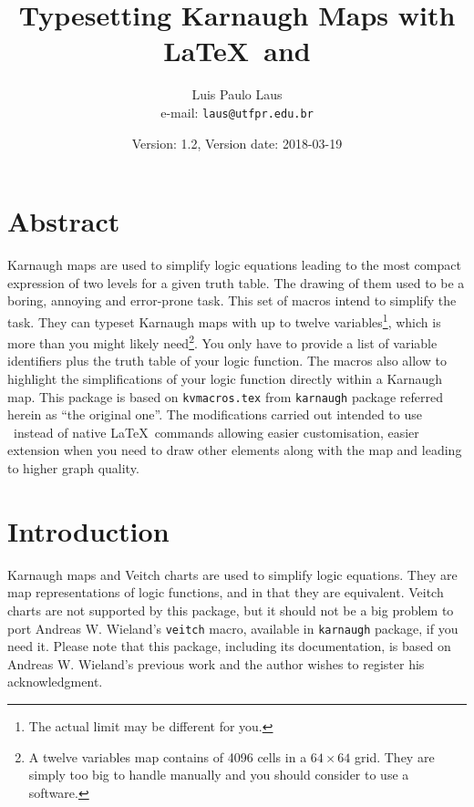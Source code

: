 \documentclass[a4paper]{ltxdoc}
\begin{document}
\title{Typesetting Karnaugh Maps with \LaTeX\ and \tikzname}
\author{Luis Paulo Laus\\e-mail: \texttt{laus@utfpr.edu.br}}
\date{Version: 1.2, Version date: 2018-03-19}

\maketitle


\section{Abstract}

Karnaugh maps are used to simplify logic equations leading to the most compact expression of two levels for a given truth table. The drawing of them used to be a boring, annoying and error-prone task. This set of macros intend to simplify the task. They can typeset Karnaugh maps with up to twelve variables\footnote{The actual limit may be different for you.}, which is more than you might likely need\footnote{A twelve variables map contains of 4096 cells in a $64\times64$ grid. They are simply too big to handle manually and you should consider to use a software.}. You only have to provide a list of variable identifiers plus the truth table of your logic function. The macros also allow to highlight the simplifications of your logic function directly within a Karnaugh map. This package is based on \verb|kvmacros.tex| from \verb|karnaugh| package referred herein as ``the original one''. The modifications carried out intended to use \tikzname\ instead of native \LaTeX\ commands allowing easier customisation, easier extension when you need to draw other elements along with the map and leading to higher graph quality.


\section{Introduction}

Karnaugh maps and Veitch charts are used to simplify logic equations. They are map representations of logic functions, and in that they are equivalent. Veitch charts are not supported by this package, but it should not be a big problem to port Andreas W. Wieland's \verb|veitch| macro, available in \verb|karnaugh| package, if you need it.
Please note that this package, including its documentation, is based on Andreas W. Wieland's previous work and the author wishes to register his acknowledgment.
\end{document}

